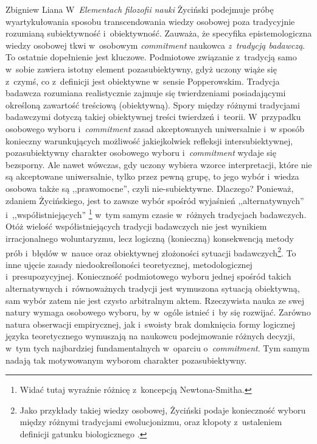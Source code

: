 \begin{artplenv}{Zbigniew Liana}
W~\textit{Elementach filozofii nauki}
\parencites*[][]{zycinski_elementy_1996}[][]{zycinski_elementy_2015} %
 Życiński podejmuje próbę wyartykułowania sposobu transcendowania wiedzy osobowej poza tradycyjnie rozumianą subiektywność i~obiektywność. Zauważa, że specyfika epistemologiczna wiedzy osobowej tkwi w~osobowym \textit{commitment} naukowca \textit{z~tradycją badawczą}. To ostatnie dopełnienie jest kluczowe. Podmiotowe związanie z~tradycją samo w~sobie zawiera istotny element pozasubiektywny, gdyż uczony wiąże się z~czymś, co z~definicji jest obiektywne w~sensie Popperowskim. Tradycja badawcza rozumiana realistycznie zajmuje się twierdzeniami posiadającymi określoną zawartość treściową (obiektywną). Spory między różnymi tradycjami badawczymi dotyczą takiej obiektywnej treści twierdzeń i~teorii. W~przypadku osobowego wyboru i~\textit{commitment} zasad akceptowanych uniwersalnie i~w sposób konieczny warunkujących możliwość jakiejkolwiek refleksji intersubiektywnej, pozasubiektywny charakter osobowego wyboru i~\textit{commitment} wydaje się bezsporny. Ale nawet wówczas, gdy uczony wybiera wzorce interpretacji, które nie są akceptowane uniwersalnie, tylko przez pewną grupę, to jego wybór i~wiedza osobowa także są ,,prawomocne'', czyli nie-subiektywne. Dlaczego? Ponieważ, zdaniem Życińskiego, jest to zawsze wybór spośród wyjaśnień ,,alternatywnych'' i~,,współistniejących'' 
\parencites[][s.~184]{zycinski_elementy_1996}[][s.~250]{zycinski_elementy_2015}%
\footnote{Widać tutaj wyraźnie różnicę z~koncepcją Newtona-Smitha.} w~tym samym czasie w~różnych tradycjach badawczych. Otóż wielość współistniejących tradycji badawczych nie jest wynikiem irracjonalnego woluntaryzmu, lecz logiczną (konieczną) konsekwencją metody prób i~błędów w~nauce oraz obiektywnej złożoności sytuacji badawczych\footnote{Jako przykłady takiej wiedzy osobowej, Życiński podaje konieczność wyboru między różnymi tradycjami ewolucjonizmu, oraz kłopoty z~ustaleniem definicji gatunku biologicznego 
\parencites[zob.][s.~184n]{zycinski_elementy_1996}[][s.~250nn]{zycinski_elementy_2015}.%
}. To inne ujęcie zasady niedookreśloności teoretycznej, metodologicznej i~presupozycyjnej. Konieczność podmiotowego wyboru jednej spośród takich alternatywnych i~równoważnych tradycji jest wymuszona sytuacją obiektywną, sam wybór zatem nie jest czysto arbitralnym aktem. Rzeczywista nauka ze swej natury wymaga osobowego wyboru, by w~ogóle istnieć i~by się rozwijać. Zarówno natura obserwacji empirycznej, jak i~swoisty brak domknięcia formy logicznej języka teoretycznego wymuszają na naukowcu podejmowanie różnych decyzji, w~tym tych najbardziej fundamentalnych w~oparciu o~\textit{commitment}. Tym samym nadają tak motywowanym wyborom charakter pozasubiektywny.


\end{artplenv}
